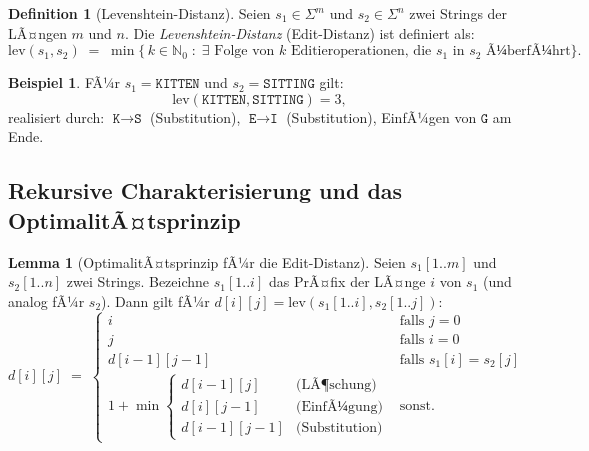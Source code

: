 ﻿\documentclass[a4paper,12pt]{article}
\theoremstyle{definition}
\newtheorem{definition}{Definition}
\newtheorem{beispiel}{Beispiel}
\newtheorem{lemma}{Lemma}
\begin{document}
\begin{definition}[Levenshtein-Distanz]
    Seien $s_1 \in \Sigma^m$ und $s_2 \in \Sigma^n$ zwei Strings der LÃ¤ngen
    $m$ und $n$. Die \emph{Levenshtein-Distanz} (Edit-Distanz) ist definiert als:
    \[
        \mathrm{lev}(s_1, s_2) \;=\; \min\bigl\{\,k \in \mathbb{N}_0\;:\;
        \exists \text{ Folge von } k \text{ Editieroperationen, die }
        s_1 \text{ in } s_2 \text{ Ã¼berfÃ¼hrt}\bigr\}.
    \]
\end{definition}

\begin{beispiel}
    FÃ¼r $s_1 = \texttt{KITTEN}$ und $s_2 = \texttt{SITTING}$ gilt:
    \[
        \mathrm{lev}(\texttt{KITTEN}, \texttt{SITTING}) = 3,
    \]
    realisiert durch: $\texttt{K} \to \texttt{S}$ (Substitution),
    $\texttt{E} \to \texttt{I}$ (Substitution),
    EinfÃ¼gen von $\texttt{G}$ am Ende.
\end{beispiel}

\subsection{Rekursive Charakterisierung und das OptimalitÃ¤tsprinzip}

\begin{lemma}[OptimalitÃ¤tsprinzip fÃ¼r die Edit-Distanz]
    \label{lemma:opt}
    Seien $s_1[1..m]$ und $s_2[1..n]$ zwei Strings. Bezeichne $s_1[1..i]$
    das PrÃ¤fix der LÃ¤nge $i$ von $s_1$ (und analog fÃ¼r $s_2$). Dann gilt
    fÃ¼r $d[i][j] = \mathrm{lev}(s_1[1..i], s_2[1..j])$:
    \[
        d[i][j] \;=\; \begin{cases}
            i & \text{falls } j = 0 \\
            j & \text{falls } i = 0 \\
            d[i-1][j-1] & \text{falls } s_1[i] = s_2[j] \\[4pt]
            1 + \min\!\begin{cases}
                d[i-1][j]   & \text{(LÃ¶schung)} \\
                d[i][j-1]   & \text{(EinfÃ¼gung)} \\
                d[i-1][j-1] & \text{(Substitution)}
            \end{cases} & \text{sonst.}
        \end{cases}
    \]
\end{lemma}
\end{document}
